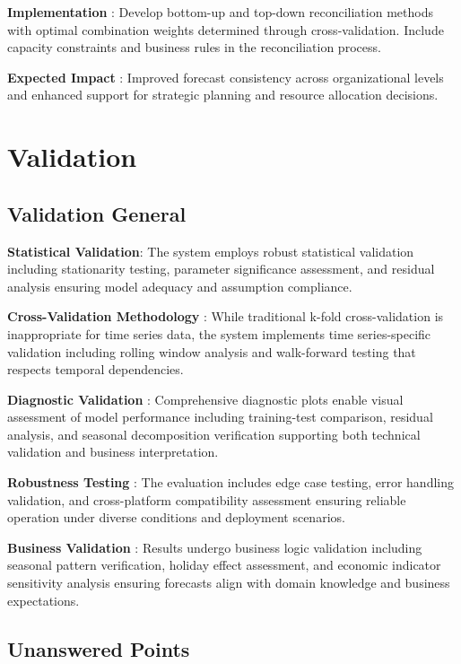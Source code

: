 \textbf{Implementation }: Develop bottom-up and top-down reconciliation methods with optimal combination weights determined through cross-validation. Include capacity constraints and business rules in the reconciliation process.

\textbf{Expected Impact }: Improved forecast consistency across organizational levels and enhanced support for strategic planning and resource allocation decisions.


\chapter{Validation}

\section{Validation General}

\textbf{Statistical Validation}: The system employs robust statistical validation including stationarity testing, parameter significance assessment, and residual analysis ensuring model adequacy and assumption compliance.

\textbf{Cross-Validation Methodology }: While traditional k-fold cross-validation is inappropriate for time series data, the system implements time series-specific validation including rolling window analysis and walk-forward testing that respects temporal dependencies.

\textbf{Diagnostic Validation }: Comprehensive diagnostic plots enable visual assessment of model performance including training-test comparison, residual analysis, and seasonal decomposition verification supporting both technical validation and business interpretation.

\textbf{Robustness Testing }: The evaluation includes edge case testing, error handling validation, and cross-platform compatibility assessment ensuring reliable operation under diverse conditions and deployment scenarios.

\textbf{Business Validation }: Results undergo business logic validation including seasonal pattern verification, holiday effect assessment, and economic indicator sensitivity analysis ensuring forecasts align with domain knowledge and business expectations.

\section{Unanswered Points}


